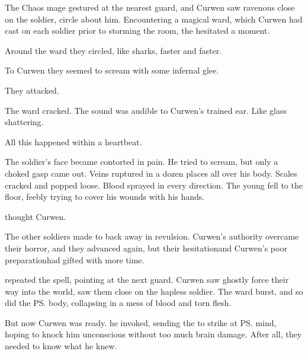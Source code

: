 The Chaos mage gestured at the nearest guard, and Curwen saw ravenous \daemons{} close on the soldier, circle about him. Encountering a magical ward, which Curwen had cast on each soldier prior to storming the room, the \daemons{} hesitated a moment. 

Around the ward they circled, like sharks, faster and faster. 

To Curwen they seemed to scream with some infernal glee. 

They attacked. 

The ward cracked. The sound was audible to Curwen's trained ear. Like glass shattering. 

All this happened within a heartbeat. 

The soldier's face became contorted in pain. 
He tried to scream, but only a choked gasp came out. 
Veins ruptured in a dozen places all over his body. 
Scales cracked and popped loose. 
Blood sprayed in every direction. 
The young \dax{} fell to the floor, feebly trying to cover his wounds with his hands. 

 thought Curwen. 

The other soldiers made to back away in revulsion. 
Curwen's authority overcame their horror, and they advanced again, but their hesitation\dash and Curwen's poor preparation\dash had gifted \Onatol{} with more time. 

 \Onatol{} repeated the spell, pointing at the next guard. 
Curwen saw ghostly \daemons{} force their way into the world, saw them close on the hapless soldier. 
The ward burst, and so did the \ps{\sphyle} body, collapsing in a mess of blood and torn flesh. 

But now Curwen was ready. 
 he invoked, sending the \Qliphah{} to strike at \ps{\Onatol}{} mind, hoping to knock him unconscious without too much brain damage. 
After all, they needed to know what he knew. 


